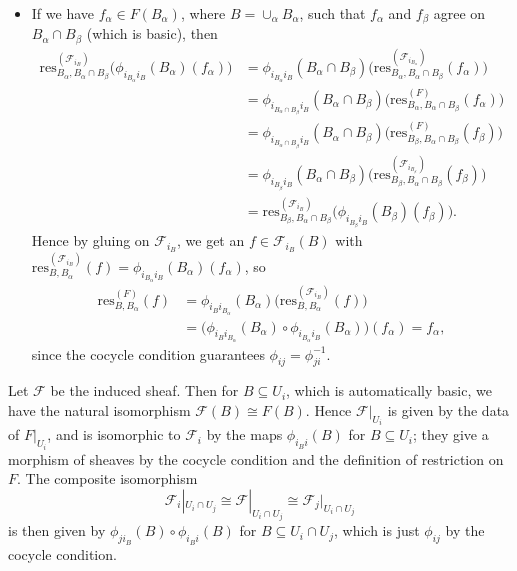 \documentclass{report}
\newcommand{\res}{{\mathrm{res}}} %
\newcommand{\scrF}{\mathscr{F}}
\begin{document}
\begin{enumerate}[label=\textbf{2.5.\Alph*.}]
\begin{itemize}
		      \item If we have $f_\alpha\in F(B_\alpha)$, where
		            $B=\cup_\alpha B_\alpha$, such that $f_\alpha$ and $f_\beta$
		            agree on $B_\alpha\cap B_\beta$ (which is basic), then
		            \begin{align*}
			            \res^{(\scrF_{i_B})}_{B_\alpha,B_\alpha\cap B_\beta}\bigl(
			            \phi_{i_{B_\alpha}i_B}(B_\alpha)(f_\alpha)\bigr)
			             & = \phi_{i_{B_\alpha}i_B}(B_\alpha\cap B_\beta)\bigl(
			            \res^{(\scrF_{i_{B_\alpha}})}
			            _{B_\alpha,B_\alpha\cap B_\beta}(f_\alpha)\bigr)                    \\
			             & = \phi_{i_{B_\alpha\cap B_\beta}i_B}(B_\alpha\cap B_\beta)\bigl(
			            \res^{(F)}_{B_\alpha,B_\alpha\cap B_\beta}(f_\alpha)\bigr)          \\
			             & = \phi_{i_{B_\alpha\cap B_\beta}i_B}(B_\alpha\cap B_\beta)\bigl(
			            \res^{(F)}_{B_\beta,B_\alpha\cap B_\beta}(f_\beta)\bigr)            \\
			             & = \phi_{i_{B_\beta}i_B}(B_\alpha\cap B_\beta)\bigl(
			            \res^{(\scrF_{i_{B_\beta}})}
			            _{B_\beta,B_\alpha\cap B_\beta}(f_\beta)\bigr)                      \\
			             & = \res^{(\scrF_{i_B})}_{B_\beta,B_\alpha\cap B_\beta}\bigl(
			            \phi_{i_{B_\beta}i_B}(B_\beta)(f_\beta)\bigr).
		            \end{align*}
		            Hence by gluing on $\scrF_{i_B}$, we get an $f\in\scrF_{i_B}(B)$ with
		            $\res^{(\scrF_{i_B})}_{B,B_\alpha}(f)=\phi_{i_{B_\alpha}i_B}(B_\alpha)(f_\alpha)$,
		            so
		            \begin{align*}
			            \res^{(F)}_{B,B_\alpha}(f)
			             & = \phi_{i_Bi_{B_\alpha}}(B_\alpha)\bigl(
			            \res_{B,B_\alpha}^{(\scrF_{i_B})}(f)\bigr)  \\
			             & = \bigl(\phi_{i_Bi_{B_\alpha}}(B_\alpha)
			            \circ\phi_{i_{B_\alpha}i_B}(B_\alpha)\bigr)
			            (f_\alpha)
			            = f_\alpha,
		            \end{align*}
		            since the cocycle condition guarantees $\phi_{ij}=\phi_{ji}^{-1}$.
	      \end{itemize}

	      Let $\scrF$ be the induced sheaf. Then for $B\subseteq U_i$, which is
	      automatically basic, we have the natural isomorphism $\scrF(B)\cong F(B)$.
	      Hence $\scrF|_{U_i}$ is given by the data of $F|_{U_i}$, and is
	      isomorphic to $\scrF_i$ by the maps $\phi_{i_Bi}(B)$ for $B\subseteq U_i$;
	      they give a morphism of sheaves by the cocycle condition and the
	      definition of restriction on $F$. The composite isomorphism
	      \begin{equation*}
		      \scrF_i|_{U_i\cap U_j} \cong \scrF|_{U_i\cap U_j} \cong \scrF_j|_{U_i\cap U_j}
	      \end{equation*}
	      is then given by $\phi_{ji_B}(B)\circ\phi_{i_Bi}(B)$ for
	      $B\subseteq U_i\cap U_j$, which is just $\phi_{ij}$ by the cocycle
	      condition.


\end{enumerate}
\end{document}
